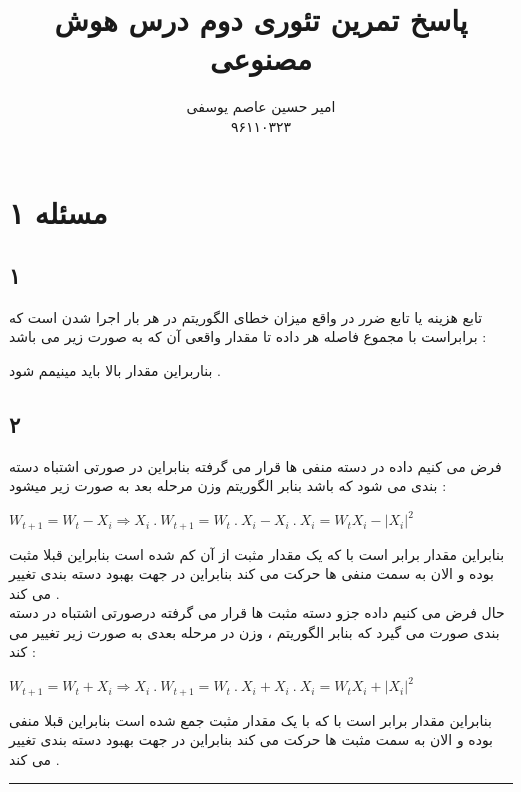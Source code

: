 \documentclass{article}
\title{پاسخ تمرین تئوری دوم درس هوش مصنوعی}
\author{امیر حسین عاصم یوسفی \\ ۹۶۱۱۰۳۲۳}
\begin{document}
	\maketitle
	\section*{مسئله ۱ }
	\subsection*{۱}
	تابع هزینه یا تابع ضرر در واقع میزان خطای الگوریتم در هر بار اجرا شدن است که برابراست با مجموع فاصله هر داده تا مقدار واقعی آن که به صورت زیر می باشد  :
	\begin{center}
	\end{center}
بناربراین مقدار بالا باید مینیمم شود  . 
\subsection*{۲}
فرض می کنیم داده 
در دسته منفی ها قرار می گرفته بنابراین در صورتی اشتباه دسته بندی می شود که 
باشد بنابر الگوریتم وزن مرحله بعد به صورت زیر میشود :
\begin{center}
	$W_{t+1} = W_t - X_i \Rightarrow X_i \ . \ W_{t+1} = W_t \ . \ X_i  - X_i \ . \ X_i = W_t X_i - |X_i|^2$
\end{center}

بنابراین مقدار 
برابر است با 
که یک مقدار مثبت از آن کم شده است بنابراین قبلا مثبت بوده و الان به سمت منفی ها حرکت می کند بنابراین در جهت بهبود دسته بندی 
تغییر می کند . \\
حال فرض می کنیم داده 
جزو دسته مثبت ها قرار می گرفته درصورتی اشتباه در دسته بندی صورت می گیرد که 
بنابر الگوریتم ، وزن در مرحله بعدی به صورت زیر تغییر می کند  :‌
\begin{center}
	$W_{t+1} = W_t + X_i \Rightarrow X_i \ . \ W_{t+1} = W_t \ . \ X_i  + X_i \ . \ X_i = W_t X_i + |X_i|^2$
\end{center}
بنابراین مقدار 
برابر است با 
که با یک مقدار مثبت جمع  شده است بنابراین قبلا منفی بوده و الان به سمت مثبت ها حرکت می کند بنابراین در جهت بهبود دسته بندی 
تغییر می کند .



\hrule
\end{document}
